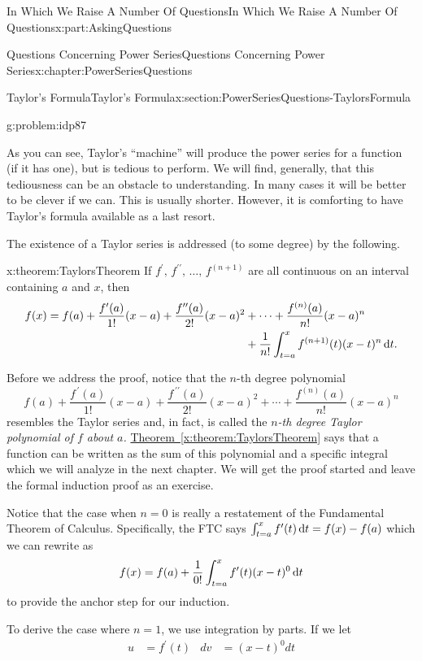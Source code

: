 \documentclass[oneside,10pt,]{book}
\newcommand{\xreffont}{\relax}
\numberwithin{equation}{section}
\newcommand{\dx}[1]{\,{\rm d}#1}
\newcommand{\amp}{&}
\begin{document}
\begin{partptx}{In Which We Raise A Number Of Questions}{}{In Which We Raise A Number Of Questions}{}{}{x:part:AskingQuestions}
\begin{chapterptx}{Questions Concerning Power Series}{}{Questions Concerning Power Series}{}{}{x:chapter:PowerSeriesQuestions}
\begin{sectionptx}{Taylor's Formula}{}{Taylor's Formula}{}{}{x:section:PowerSeriesQuestions-TaylorsFormula}
\begin{problem}{}{g:problem:idp87}
\end{problem}
As you can see, Taylor's ``machine'' will produce the power series for a function (if it has one), but is tedious to perform. We will find, generally, that this tediousness can be an obstacle to understanding. In many cases it will be better to be clever if we can. This is usually shorter. However, it is comforting to have Taylor's formula available as a last resort.%
\par
The existence of a Taylor series is addressed (to some degree) by the following.%
\begin{theorem}{}{}{x:theorem:TaylorsTheorem}%
 If \(f^\prime,\,f^{\prime\prime},\,\ldots,\,f^{(n+1)}\) are all continuous on an interval containing \(a\) and \(x\), then%
\begin{align*}
f(x)=f(a)+\frac{f^{\prime}(a)}{1!}(x-a)+\frac{f^{\prime \prime}(a)}{2!}(x-a)^2\amp +\cdots+\frac{f^{(n)}(a)}{n!}(x-a)^n\\
\amp + \frac{1}{n!}\int_{t=a}^xf^{(n+1)}(t)(x-t)^n\dx{t}\text{.}
\end{align*}
%
\end{theorem}
Before we address the proof, notice that the \(n\)-th degree polynomial%
\begin{equation*}
f(a)+\frac{f^{\,\prime}(a)}{1!}(x-a)+\frac{f^{\,\prime\prime}(a)}{2!}(x-a)^2+\cdots+\frac{f^{(n)}(a)}{n!}(x-a)^n
\end{equation*}
resembles the Taylor series and, in fact, is called the \emph{\(n\)-th degree Taylor polynomial of \(f\) about \(a\).} \hyperref[x:theorem:TaylorsTheorem]{Theorem~{\xreffont\ref{x:theorem:TaylorsTheorem}}} says that a function can be written as the sum of this polynomial and a specific integral which we will analyze in the next chapter. We will get the proof started and leave the formal induction proof as an exercise.%
\par
Notice that the case when \(n=0\) is really a restatement of the Fundamental Theorem of Calculus. Specifically, the FTC says \(\int_{t=a}^xf^\prime(t)\dx{ t}=f(x)-f(a)\) which we can rewrite as%
\begin{equation*}
f(x)=f(a)+\frac{1}{0!}\int_{t=a}^xf^\prime(t)(x-t)^0\dx{ t}
\end{equation*}
to provide the anchor step for our induction.%
\par
To derive the case where \(n=1\), we use integration by parts. If we let%
\begin{align*}
u\amp =f^\prime(t)\amp  d v\amp =(x-t)^0d t\\

\end{align*}
\end{sectionptx}
\end{chapterptx}
\end{partptx}
\end{document}
